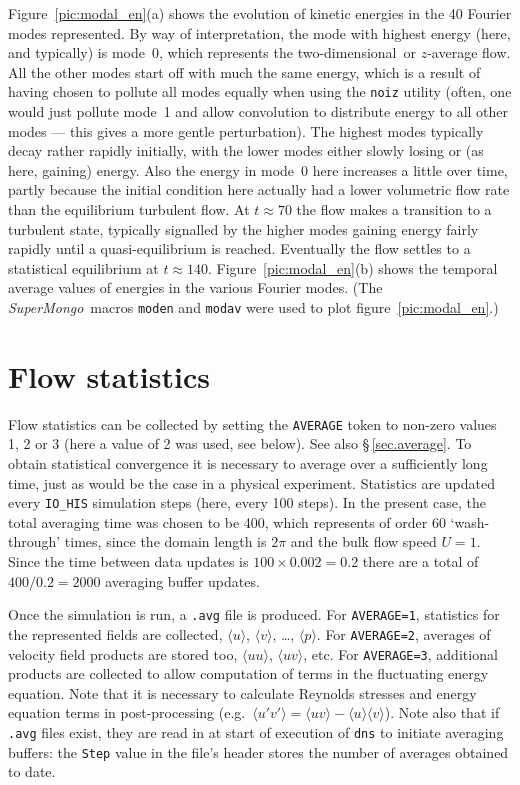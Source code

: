 \documentclass[11pt]{report}
\newcommand{\SM}{\emph{SuperMongo}}
\newcommand\twod{two-di\-men\-sion\-al}
\newcommand{\eg}{e.g.\ } \newcommand{\CC}{\mathrm{c.c.}}
\begin{document}
Figure~\ref{pic:modal_en}(a) shows the evolution of kinetic energies
in the 40 Fourier modes represented.  By way of interpretation, the
mode with highest energy (here, and typically) is mode~0, which
represents the \twod\ or $z$-average flow.  All the other modes start
off with much the same energy, which is a result of having chosen to
pollute all modes equally when using the \verb|noiz| utility (often,
one would just pollute mode~1 and allow convolution to distribute
energy to all other modes --- this gives a more gentle perturbation).
The highest modes typically decay rather rapidly initially, with the
lower modes either slowly losing or (as here, gaining) energy.  Also
the energy in mode~0 here increases a little over time, partly because
the initial condition here actually had a lower volumetric flow rate
than the equilibrium turbulent flow. At $t\approx70$ the flow makes a
transition to a turbulent state, typically signalled by the higher
modes gaining energy fairly rapidly until a quasi-equilibrium is
reached. Eventually the flow settles to a statistical equilibrium at
$t\approx140$.  Figure~\ref{pic:modal_en}(b) shows the temporal
average values of energies in the various Fourier modes.  (The
\SM\ macros \verb|moden| and \verb|modav| were used to
plot figure~\ref{pic:modal_en}.)

\section{Flow statistics}

Flow statistics can be collected by setting the \verb|AVERAGE| token
to non-zero values 1, 2 or 3 (here a value of 2 was used, see below).
See also \S\,\ref{sec.average}.  To obtain statistical convergence it
is necessary to average over a sufficiently long time, just as would
be the case in a physical experiment. Statistics are updated every
\verb|IO_HIS| simulation steps (here, every 100 steps).  In the
present case, the total averaging time was chosen to be 400, which
represents of order 60 `wash-through' times, since the domain length
is $2\pi$ and the bulk flow speed $U=1$.  Since the time between data
updates is $100\times0.002=0.2$ there are a total of $400/0.2=2000$
averaging buffer updates.

Once the simulation is run, a \texttt{.avg} file is produced. For
\verb|AVERAGE=1|, statistics for the represented fields are collected,
\ie $\langle u\rangle$, $\langle v\rangle$, \ldots, $\langle
p\rangle$.  For \verb|AVERAGE=2|, averages of velocity field products
are stored too, \ie $\langle uu\rangle$, $\langle uv\rangle$, etc.
For \verb|AVERAGE=3|, additional products are collected to allow
computation of terms in the fluctuating energy equation.  Note that it
is necessary to calculate Reynolds stresses and energy equation terms
in post-processing (\eg $\langle u'v'\rangle = \langle
uv\rangle-\langle u\rangle\langle v\rangle$).  Note also that if
\verb|.avg| files exist, they are read in at start of execution of
\verb|dns| to initiate averaging buffers: the \verb|Step| value in the
file's header stores the number of averages obtained to date.
\end{document}
